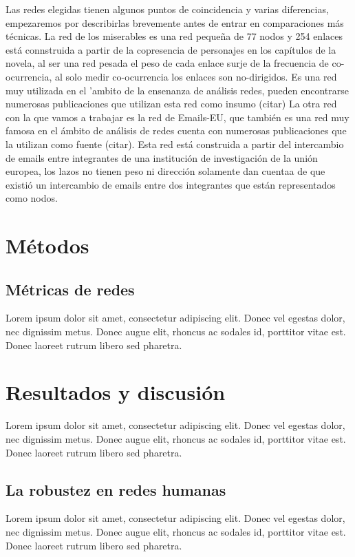 \documentclass[conference]{IEEEtran}
\begin{document}
Las redes elegidas tienen algunos puntos de coincidencia y varias diferencias, empezaremos por describirlas brevemente antes de entrar en comparaciones más técnicas.
La red de los miserables es una red pequeña de 77 nodos y 254 enlaces está connstruida a partir de la copresencia de personajes en los capítulos de la novela, al ser una red pesada el peso de cada enlace surje de la frecuencia de co-ocurrencia, al solo medir co-ocurrencia los enlaces son no-dirigidos. Es una red muy utilizada en el 'ambito de la ensenanza de análisis redes, pueden encontrarse numerosas publicaciones que utilizan esta red como insumo (citar) 
La otra red con la que vamos a trabajar es la red de Emails-EU, que también es una red muy famosa en el ámbito de análisis de redes cuenta con numerosas publicaciones que la utilizan como fuente (citar). Esta red está construida a partir del intercambio de emails entre integrantes de una institución de investigación de la unión europea, los lazos no tienen peso ni dirección solamente dan cuentaa de que existió un intercambio de emails entre dos integrantes que están representados como nodos.


\section{Métodos}

\subsection{Métricas de redes}
Lorem ipsum dolor sit amet, consectetur adipiscing elit. Donec vel egestas dolor, nec dignissim metus. Donec augue elit, rhoncus ac sodales id, porttitor vitae est. Donec laoreet rutrum libero sed pharetra.
\section{Resultados y discusión}
Lorem ipsum dolor sit amet, consectetur adipiscing elit. Donec vel egestas dolor, nec dignissim metus. Donec augue elit, rhoncus ac sodales id, porttitor vitae est. Donec laoreet rutrum libero sed pharetra.
\subsection{La robustez en redes humanas}
Lorem ipsum dolor sit amet, consectetur adipiscing elit. Donec vel egestas dolor, nec dignissim metus. Donec augue elit, rhoncus ac sodales id, porttitor vitae est. Donec laoreet rutrum libero sed pharetra.
\end{document}
